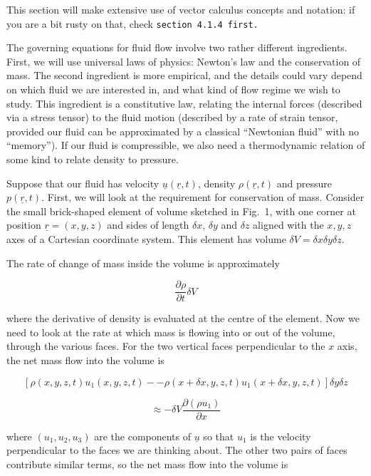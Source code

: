   This section will make extensive use of vector calculus concepts and 
  notation: if you are a bit rusty on that, check \tt{}section 4.1.4\rm{} first. 

  The governing equations for fluid flow involve two rather different 
  ingredients. First, we will use universal laws of physics: Newton's law and 
  the conservation of mass. The second ingredient is more empirical, and the 
  details could vary depend on which fluid we are interested in, and what kind 
  of flow regime we wish to study. This ingredient is a constitutive law, 
  relating the internal forces (described via a stress tensor) to the fluid 
  motion (described by a rate of strain tensor, provided our fluid can be 
  approximated by a classical ``Newtonian fluid'' with no ``memory''). If our 
  fluid is compressible, we also need a thermodynamic relation of some kind to 
  relate density to pressure. 

  Suppose that our fluid has velocity $\underline{u}(\underline{r},t)$, density 
  $\rho(\underline{r},t)$ and pressure $p(\underline{r},t)$. First, we will 
  look at the requirement for conservation of mass. Consider the small 
  brick-shaped element of volume sketched in Fig.\ 1, with one corner at 
  position $\underline{r}=(x,y,z)$ and sides of length $\delta x$, $\delta y$ 
  and $\delta z$ aligned with the $x,y,z$ axes of a Cartesian coordinate 
  system. This element has volume $\delta V= \delta x \delta y \delta z$. 

  The rate of change of mass inside the volume is approximately 

  $$\dfrac{\partial \rho}{\partial t} \delta V \tag{1}$$ 

  where the derivative of density is evaluated at the centre of the element. 
  Now we need to look at the rate at which mass is flowing into or out of the 
  volume, through the various faces. For the two vertical faces perpendicular 
  to the $x$ axis, the net mass flow into the volume is 

  $$\left[\rho(x,y,z,t) u_1(x,y,z,t) -- \rho (x + \delta x,y,z,t) u_1(x + 
  \delta x,y,z,t) \right] \delta y \delta z $$ 

  $$\approx -\delta V \dfrac{\partial (\rho u_1)}{\partial x} \tag{2}$$ 

  where $(u_1,u_2,u_3)$ are the components of $\underline{u}$ so that $u_1$ is 
  the velocity perpendicular to the faces we are thinking about. The other two 
  pairs of faces contribute similar terms, so the net mass flow into the volume 
  is 

